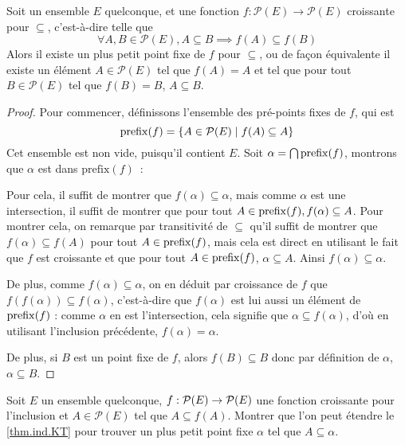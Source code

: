\begin{theorem}\label{thm.ind.KT}
   Soit un ensemble $E$ quelconque, et une fonction
  $f : \mathcal P(E) \to \mathcal P(E)$ croissante pour $\subseteq$,
  c'est-à-dire telle que
  \[\forall A,B\in\mathcal P(E), A\subseteq B \implies f(A)\subseteq f(B)\]
  Alors il existe un plus petit point fixe de $f$ pour $\subseteq$, ou de façon
  équivalente il existe un élément $A\in \mathcal P(E)$ tel que $f(A)=A$ et tel
  que pour tout $B\in\mathcal P(E)$ tel que $f(B)=B$, $A\subseteq B$.
\end{theorem}
\begin{proof}
  Pour commencer, définissons l'ensemble des pré-points fixes de $f$, qui est
  \[\operatorname{prefix}(f) = \{ A \in \mathcal P(E)\mid f(A)\subseteq A\}\]
  Cet ensemble est non vide, puisqu'il contient $E$.
  Soit $\alpha = \bigcap \operatorname{prefix}(f)$, montrons que $\alpha$ est dans
  $\mathrm{prefix}(f)$~:

  Pour cela, il suffit de montrer que $f(\alpha)\subseteq \alpha$, mais comme
  $\alpha$ est une intersection, il suffit de montrer que pour tout
  $A\in\operatorname{prefix}(f), f(\alpha)\subseteq A$. Pour montrer cela, on
  remarque par transitivité de $\subseteq$ qu'il suffit de montrer que
  $f(\alpha)\subseteq f(A)$ pour tout $A\in \operatorname{prefix}(f)$, mais cela est
  direct en utilisant le fait que $f$ est croissante et que pour tout
  $A\in \operatorname{prefix}(f)$, $\alpha \subseteq A$. Ainsi
  $f(\alpha)\subseteq \alpha$.

  De plus, comme $f(\alpha)\subseteq \alpha$, on en déduit par croissance de
  $f$ que $f(f(\alpha))\subseteq f(\alpha)$, c'est-à-dire que $f(\alpha)$ est
  lui aussi un élément de $\operatorname{prefix}(f)$ : comme $\alpha$ en est l'intersection,
  cela signifie que $\alpha \subseteq f(\alpha)$, d'où en
  utilisant l'inclusion précédente, $f(\alpha) = \alpha$.

  De plus, si $B$ est un point fixe de $f$, alors $f(B)\subseteq B$ donc par
  définition de $\alpha$, $\alpha \subseteq B$.
\end{proof}

\begin{exercise}
  Soit $E$ un ensemble quelconque, $f : \mathcal{P}(E) \to \mathcal{P}(E)$ une
  fonction croissante pour l'inclusion et $A \in \mathcal P(E)$ tel que
  $A\subseteq f(A)$. Montrer que l'on peut étendre le \cref{thm.ind.KT} pour
  trouver un plus petit point fixe $\alpha$ tel que $A\subseteq \alpha$.
\end{exercise}

